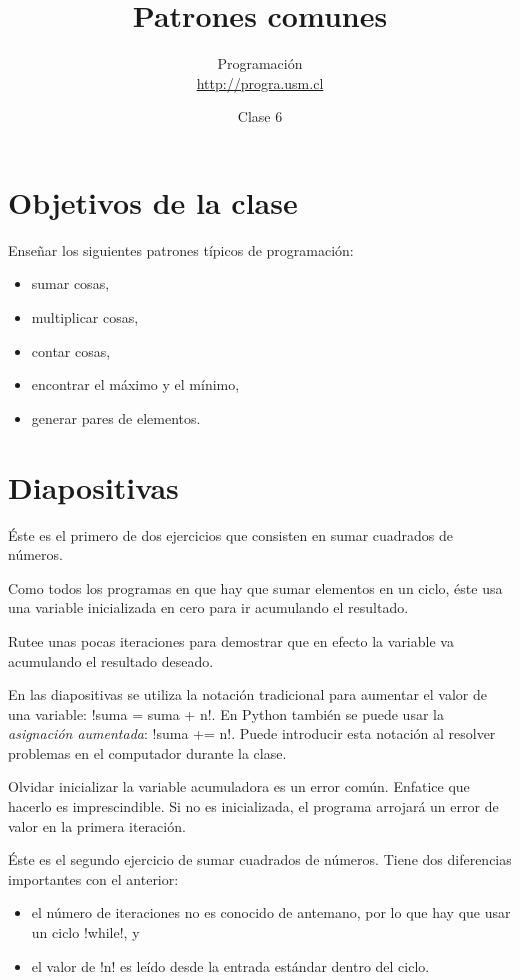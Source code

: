 \documentclass[10pt]{article}
\title{Patrones comunes}
\author{Programación \\ \url{http://progra.usm.cl}}
\date{Clase 6}
\begin{document}
  \maketitle

  \section*{Objetivos de la clase}
  Enseñar los siguientes patrones típicos de programación:
  \begin{itemize}
    \item sumar cosas,
    \item multiplicar cosas,
    \item contar cosas,
    \item encontrar el máximo y el mínimo,
    \item generar pares de elementos.
  \end{itemize}

  \section*{Diapositivas}


  Éste es el primero de dos ejercicios
  que consisten en sumar cuadrados de números.

  Como todos los programas en que hay que sumar elementos en un ciclo,
  éste usa una variable inicializada en cero para ir acumulando el resultado.

  Rutee unas pocas iteraciones para demostrar que en efecto
  la variable va acumulando el resultado deseado.

  En las diapositivas se utiliza la notación tradicional
  para aumentar el valor de una variable:
  \li!suma = suma + n!.
  En Python también se puede usar la \emph{asignación aumentada}:
  \li!suma += n!.
  Puede introducir esta notación al resolver problemas en el computador durante la clase.

  Olvidar inicializar la variable acumuladora es un error común.
  Enfatice que hacerlo es imprescindible.
  Si no es inicializada, el programa arrojará un error de valor en la primera iteración.


  Éste es el segundo ejercicio de sumar cuadrados de números.
  Tiene dos diferencias importantes con el anterior:
  \begin{itemize}
    \item el número de iteraciones no es conocido de antemano,
      por lo que hay que usar un ciclo \li!while!, y
    \item el valor de \li!n! es leído desde la entrada estándar
      dentro del ciclo.
  \end{itemize}
  
\end{document}
